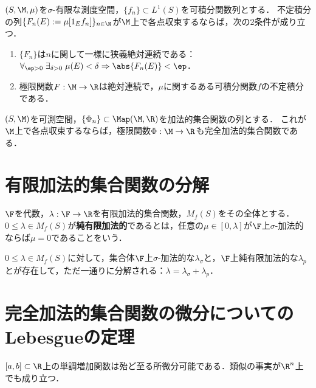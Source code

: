 \documentclass[uplatex, dvipdfmx]{jsreport}
\begin{document}
\begin{theorem}[Saks (1933)]
    $(S,\M,\mu)$を$\sigma$-有限な測度空間，$\{f_n\}\subset L^1(S)$を可積分関数列とする．
    不定積分の列$\{F_n(E):=\mu[1_Ef_n]\}_{n\in\N}$が$\M$上で各点収束するならば，次の2条件が成り立つ．
    \begin{enumerate}
        \item $\{F_n\}$は$n$に関して一様に狭義絶対連続である：$\forall_{\ep>0}\;\exists_{\delta>0}\;\mu(E)<\delta\Rightarrow\abs{F_n(E)}<\ep$．
        \item 極限関数$F:\M\to\R$は絶対連続で，$\mu$に関するある可積分関数$f$の不定積分である．
    \end{enumerate}
\end{theorem}

\begin{corollary}
    $(S,\M)$を可測空間，$\{\Phi_n\}\subset\Map(\M,\R)$を加法的集合関数の列とする．
    これが$\M$上で各点収束するならば，極限関数$\Phi:\M\to\R$も完全加法的集合関数である．
\end{corollary}

\section{有限加法的集合関数の分解}

\begin{definition}
    $\F$を代数，$\lambda:\F\to\R$を有限加法的集合関数，$M_f(S)$をその全体とする．
    $0\le\lambda\in M_f(S)$が\textbf{純有限加法的}であるとは，任意の$\mu\in[0,\lambda]$が$\F$上$\sigma$-加法的ならば$\mu=0$であることをいう．
\end{definition}

\begin{theorem}
    $0\le\lambda\in M_f(S)$に対して，集合体$\F$上$\sigma$-加法的な$\lambda_\sigma$と，$\F$上純有限加法的な$\lambda_p$とが存在して，ただ一通りに分解される：$\lambda=\lambda_\sigma+\lambda_p$．
\end{theorem}

\section{完全加法的集合関数の微分についてのLebesgueの定理}

\begin{tcolorbox}[colframe=ForestGreen, colback=ForestGreen!10!white,breakable,colbacktitle=ForestGreen!40!white,coltitle=black,fonttitle=\bfseries\sffamily,
title=]
    $[a,b]\subset\R$上の単調増加関数は殆ど至る所微分可能である．類似の事実が$\R^n$上でも成り立つ．
\end{tcolorbox}
\end{document}
